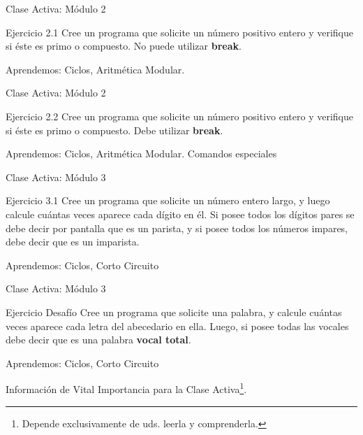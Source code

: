\documentclass{beamer}
\begin{document}
\begin{frame}[fragile]{Clase Activa: Módulo 2}
\begin{exampleblock}{Ejercicio 2.1}
Cree un programa que solicite un número positivo entero y verifique si éste es primo o compuesto. No puede utilizar \textbf{break}.
\end{exampleblock}

{\tiny Aprendemos: Ciclos, Aritmética Modular.}
\end{frame}

\begin{frame}[fragile]{Clase Activa: Módulo 2}
\begin{exampleblock}{Ejercicio 2.2}
Cree un programa que solicite un número positivo entero y verifique si éste es primo o compuesto. Debe utilizar \textbf{break}.
\end{exampleblock}

{\tiny Aprendemos: Ciclos, Aritmética Modular. Comandos especiales}
\end{frame}

\begin{frame}[fragile]{Clase Activa: Módulo 3}
\begin{exampleblock}{Ejercicio 3.1}
Cree un programa que solicite un número entero largo, y luego calcule cuántas veces aparece cada dígito en él. Si posee todos los dígitos pares se debe decir por pantalla que es un parista, y si posee todos los números impares, debe decir que es un imparista. 
\end{exampleblock}

{\tiny Aprendemos: Ciclos, Corto Circuito}
\end{frame}

\begin{frame}[fragile]{Clase Activa: Módulo 3}
\begin{exampleblock}{Ejercicio Desafío}
Cree un programa que solicite una palabra, y calcule cuántas veces aparece cada letra del abecedario en ella. Luego, si posee todas las vocales debe decir que es una palabra \textbf{vocal total}. 
\end{exampleblock}

{\tiny Aprendemos: Ciclos, Corto Circuito}
\end{frame}

\begin{frame}
\centering \Huge Información de Vital Importancia para la Clase Activa\footnote{Depende exclusivamente de uds. leerla y comprenderla.}.
\end{frame}
\end{document}
